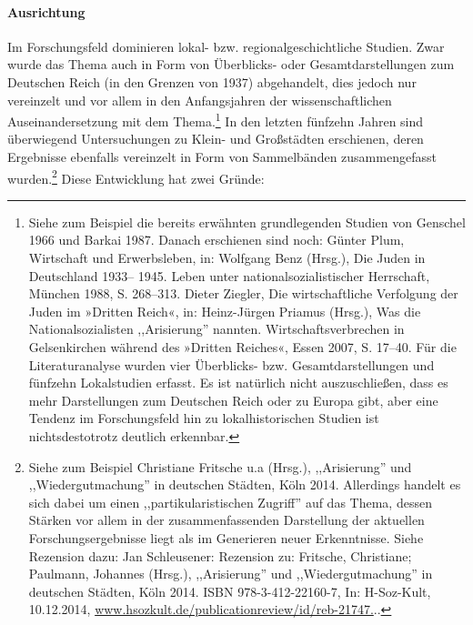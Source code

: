 \paragraph{Ausrichtung}Im Forschungsfeld dominieren lokal- bzw. regionalgeschichtliche Studien. Zwar wurde das Thema auch in Form von Überblicks- oder Gesamtdarstellungen zum Deutschen Reich (in den Grenzen von 1937) abgehandelt, dies jedoch nur vereinzelt und vor allem in den Anfangsjahren der wissenschaftlichen Auseinandersetzung mit dem Thema.\footnote{Siehe zum Beispiel die bereits erwähnten grundlegenden Studien von Genschel 1966 und Barkai 1987. Danach erschienen sind noch: Günter
Plum, Wirtschaft und Erwerbsleben, in: Wolfgang Benz (Hrsg.), Die Juden in Deutschland 1933–
1945. Leben unter nationalsozialistischer Herrschaft, München 1988, S. 268–313. Dieter Ziegler, Die wirtschaftliche
Verfolgung der Juden im »Dritten Reich«, in: Heinz-Jürgen Priamus (Hrsg.), Was die
Nationalsozialisten ,,Arisierung'' nannten. Wirtschaftsverbrechen in Gelsenkirchen während des
»Dritten Reiches«, Essen 2007, S. 17–40. Für die Literaturanalyse wurden vier Überblicks- bzw. Gesamtdarstellungen und fünfzehn Lokalstudien erfasst. Es ist natürlich nicht auszuschließen, dass es mehr Darstellungen zum Deutschen Reich oder zu Europa gibt, aber eine Tendenz im Forschungsfeld hin zu lokalhistorischen Studien ist nichtsdestotrotz deutlich erkennbar.} In den letzten fünfzehn Jahren sind überwiegend Untersuchungen zu Klein- und Großstädten erschienen, deren Ergebnisse ebenfalls vereinzelt in Form von Sammelbänden zusammengefasst wurden.\footnote{Siehe zum Beispiel Christiane Fritsche u.a (Hrsg.), ,,Arisierung'' und ,,Wiedergutmachung'' in deutschen Städten, Köln 2014. Allerdings handelt es sich dabei um einen ,,partikularistischen Zugriff'' auf das Thema, dessen Stärken vor allem in der zusammenfassenden Darstellung der aktuellen Forschungsergebnisse liegt als im Generieren neuer Erkenntnisse. Siehe Rezension dazu: Jan Schleusener: Rezension zu: Fritsche, Christiane; Paulmann, Johannes (Hrsg.), ,,Arisierung'' und ,,Wiedergutmachung'' in deutschen Städten, Köln  2014. ISBN 978-3-412-22160-7, In: H-Soz-Kult, 10.12.2014, \url{www.hsozkult.de/publicationreview/id/reb-21747.}..} Diese Entwicklung hat zwei Gründe:

